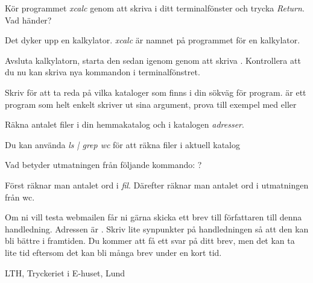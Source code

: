 \documentclass[a4paper,twocolumn]{book}
\begin{document}
\begin{exercise}
  Kör programmet \emph{xcalc} genom att skriva  i
  ditt terminalfönster och trycka \emph{Return}. Vad händer?
  \begin{answer}
    Det dyker upp en kalkylator. \emph{xcalc} är namnet på
    programmet för en kalkylator.
  \end{answer}
\end{exercise}
\begin{exercise}
  Avsluta kalkylatorn, starta den sedan
  igenom genom att skriva . Kontrollera att du
  nu kan skriva nya kommandon i terminalfönstret.
\end{exercise}

\begin{exercise}
  Skriv  för att ta reda på vilka kataloger som finns i
  din sökväg för program.  är ett program som helt
  enkelt skriver ut sina argument, prova till exempel med
   eller 
\end{exercise}

\begin{exercise}
  Räkna antalet filer i din hemmakatalog och i katalogen \emph{adresser}.
  \begin{answer}
    Du kan använda \emph{ls | grep wc} för att räkna filer i aktuell katalog
  \end{answer}
\end{exercise}
\begin{exercise}
  Vad betyder utmatningen från följande kommando: 
  \mbox{}?
  \begin{answer}
    Först räknar man antalet ord i \emph{fil}. Därefter räknar man
    antalet ord i utmatningen från wc.
  \end{answer}
\end{exercise}

\begin{exercise}
  Om ni vill testa webmailen får ni gärna skicka ett brev till
  författaren till denna handledning. Adressen är
  . Skriv lite synpunkter på handledningen så att
  den kan bli bättre i framtiden. Du kommer att få ett svar på ditt
  brev, men det kan ta lite tid eftersom det kan bli många brev under
  en kort tid.
\end{exercise}


\appendix
\answers
\label{answers}

\onecolumn
\printindex

\cleardoublepage
\thispagestyle{empty}
\hbox{}
\newpage
\onecolumn
\thispagestyle{empty}
\hbox{}\vfill\noindent\small
\centerline{LTH, Tryckeriet i E-huset, Lund \number\year{}}
\end{document}
